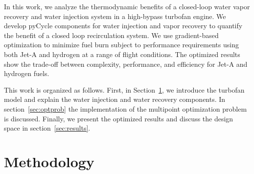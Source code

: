 \documentclass[conf]{new-aiaa}
\begin{document}
In this work, we analyze the thermodynamic benefits of a closed-loop water vapor recovery and water injection system in a high-bypass turbofan engine.
We develop pyCycle components for water injection and vapor recovery to quantify the benefit of a closed loop recirculation system.
We use gradient-based optimization to minimize fuel burn subject to performance requirements using both Jet-A and hydrogen at a range of flight conditions.
The optimized results show the trade-off between complexity, performance, and efficiency for Jet-A and hydrogen fuels.

This work is organized as follows. First, in Section~\ref{sec:method}, we introduce the turbofan model and explain the water injection and water recovery components.
In section~\ref{sec:optprob} the implementation of the multipoint optimization problem is discussed.
Finally, we present the optimized results and discuss the design space in section~\ref{sec:results}.

\section{Methodology}
\label{sec:method}
\end{document}
